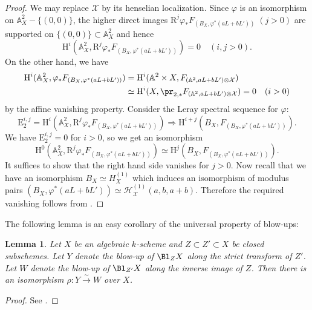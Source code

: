 \documentclass{amsart}
\theoremstyle{plain}
\newtheorem{lemma}[theorem]{Lemma}
\theoremstyle{definition}
\theoremstyle{remark}
\numberwithin{equation}{section}
\begin{document}
\begin{proof}
    We may replace $\mathcal{X}$ by its henselian localization.
    Since $\varphi$ is an isomorphism on $\mathbb{A}^2_X-\{(0,0)\}$, the higher direct images $\mathrm{R}^j\varphi_*F_{(B_X,\varphi^*(aL+bL'))}\;(j>0)$ are supported on $\{(0,0)\}\subset\mathbb{A}^2_X$ and hence
	$$
		\mathrm{H}^i(\mathbb{A}^2_X, \mathrm{R}^j\varphi_*F_{(B_X,\varphi^*(aL+bL'))})=0\quad (i,j>0).
	$$
	On the other hand, we have
	\begin{align*}
		\mathrm{H}^i(\mathbb{A}^2_X, \varphi_*F_{(B_X,\varphi^*(aL+bL'))})
            ={}&\mathrm{H}^i(\mathbb{A}^2\times X,F_{(\mathbb{A}^2,a L+b L')\otimes \mathcal{X}})\\
            \simeq{}&\mathrm{H}^i(X,\pr_{2,*}F_{(\mathbb{A}^2,a L+b L')\otimes \mathcal{X}})=0\quad (i>0)
        \end{align*}
        by the affine vanishing property.
        Consider the Leray spectral sequence for $\varphi$:
        $$
            \mathrm{E}^{i,j}_2 = \mathrm{H}^i(\mathbb{A}^2_X, \mathrm{R}^j\varphi_*F_{(B_X,\varphi^*(aL+bL'))})
            \Rightarrow \mathrm{H}^{i+j}(B_X,F_{(B_X,\varphi^*(aL+bL'))}).
        $$
        We have $\mathrm{E}^{i,j}_2=0$ for $i>0$, so we get an isomorphism
	$$
		\mathrm{H}^0(\mathbb{A}^2_X, \mathrm{R}^j\varphi_*F_{(B_X,\varphi^*(aL+bL'))})\simeq \mathrm{H}^j(B_X,F_{(B_X,\varphi^*(aL+bL'))}).
	$$
	It suffices to show that the right hand side vanishes for $j>0$.
	Now recall that we have an isomorphism $B_X\simeq H^{(1)}_X$ which induces an isomorphism of modulus pairs $(B_X,\varphi^*(aL+bL'))\simeq \mathcal{H}_\mathcal{X}^{(1)}(a,b,a+b)$.
        Therefore the required vanishing follows from .
\end{proof}

The following lemma is an easy corollary of the universal property of blow-ups:

\begin{lemma}\label{blowup_exchange}
	Let $X$ be an algebraic $k$-scheme and $Z\subset Z'\subset X$ be closed subschemes.
	Let $Y$ denote the blow-up of $\Bl_ZX$ along the strict transform of $Z'$.
	Let $W$ denote the blow-up of $\Bl_{Z'}X$ along the inverse image of $Z$.
	Then there is an isomorphism $\rho\colon Y \xrightarrow{\sim} W$ over $X$.
\end{lemma}

\begin{proof}
	See \cite[Lemma 2.15]{BRS}.
\end{proof}
\end{document}

